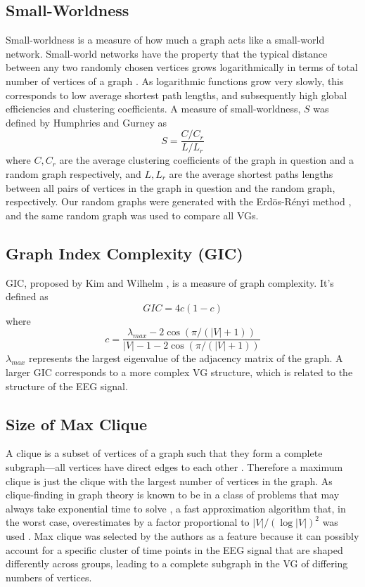\documentclass[Afour,times,sageh]{sagej}
\begin{document}
\subsection{Small-Worldness}
Small-worldness is a measure of how much a graph acts like a small-world network. Small-world networks have the property that the typical distance between any two randomly chosen vertices grows logarithmically in terms of total number of vertices of a graph \citep{Latora}. As logarithmic functions grow very slowly, this corresponds to low average shortest path lengths, and subsequently high global efficiencies and clustering coefficients. A measure of small-worldness, $S$ was defined by Humphries and Gurney \citep{Humphries2008} as $$S = \frac{C/C_r}{L/L_r}$$where $C, C_r$ are the average clustering coefficients of the graph in question and a random graph respectively, and $L, L_r$ are the average shortest paths lengths between all pairs of vertices in the graph in question and the random graph, respectively. Our random graphs were generated with the Erd\"{o}s-R\'{e}nyi method \citep{erdos59a}, and the same random graph was used to compare all VGs.
\subsection{Graph Index Complexity (GIC)}
GIC, proposed by Kim and Wilhelm \citep{Kim2008}, is a measure of graph complexity. It’s defined as $$GIC = 4c(1-c)$$ where $$c = \frac{\lambda_{max} - 2 \cos(\pi / (|V| + 1))}{|V| - 1 - 2 \cos(\pi/(|V| + 1))}$$$\lambda_{max}$ represents the largest eigenvalue of the adjacency matrix of the graph. A larger GIC corresponds to a more complex VG structure, which is related to the structure of the EEG signal.
\subsection{Size of Max Clique}
A clique is a subset of vertices of a graph such that they form a  complete subgraph---all vertices have direct edges to each other \cite{Luce1949}. Therefore a maximum clique is just the clique with the largest number of vertices in the graph. As clique-finding in graph theory is known to be in a class of problems that may always take exponential time to solve \citep{Boppana1992}, a fast approximation algorithm that, in the worst case, overestimates by a factor proportional to $|V|/(\log|V|)^2$ was used \citep{PAPADIMITRIOU1977}. Max clique was selected by the authors as a feature because it can possibly account for a specific cluster of time points in the EEG signal that are shaped differently across groups, leading to a complete subgraph in the VG of differing numbers of vertices.
\end{document}
